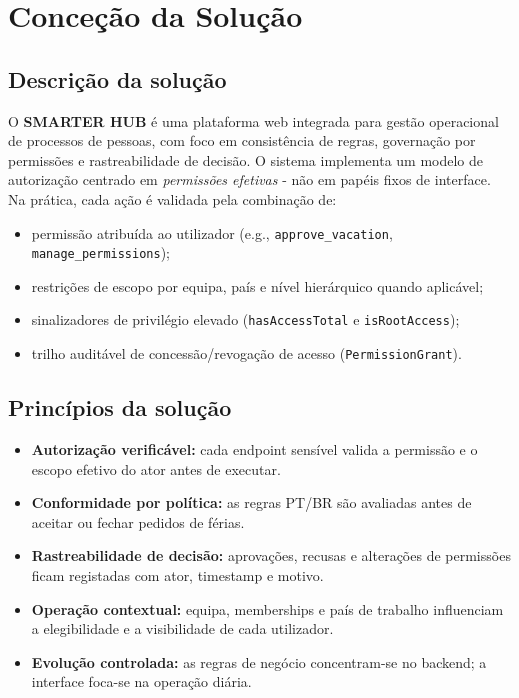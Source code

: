 \documentclass[11pt,a4paper,twoside]{article}
\begin{document}
\section{Conceção da Solução}
\label{sec:solucao}

\subsection{Descrição da solução}

O \textbf{SMARTER HUB} é uma plataforma web integrada para gestão operacional de processos de pessoas, com foco em consistência de regras, governação por permissões e rastreabilidade de decisão. O sistema implementa um modelo de autorização centrado em \emph{permissões efetivas} - não em papéis fixos de interface. Na prática, cada ação é validada pela combinação de:

\begin{itemize}
  \item permissão atribuída ao utilizador (e.g., \texttt{approve\_vacation}, \texttt{manage\_permissions});
  \item restrições de escopo por equipa, país e nível hierárquico quando aplicável;
  \item sinalizadores de privilégio elevado (\texttt{hasAccessTotal} e \texttt{isRootAccess});
  \item trilho auditável de concessão/revogação de acesso (\texttt{PermissionGrant}).
\end{itemize}

\subsection{Princípios da solução}

\begin{itemize}
  \item \textbf{Autorização verificável:} cada endpoint sensível valida a permissão e o escopo efetivo do ator antes de executar.
  \item \textbf{Conformidade por política:} as regras PT/BR são avaliadas antes de aceitar ou fechar pedidos de férias.
  \item \textbf{Rastreabilidade de decisão:} aprovações, recusas e alterações de permissões ficam registadas com ator, timestamp e motivo.
  \item \textbf{Operação contextual:} equipa, memberships e país de trabalho influenciam a elegibilidade e a visibilidade de cada utilizador.
  \item \textbf{Evolução controlada:} as regras de negócio concentram-se no backend; a interface foca-se na operação diária.
\end{itemize}
\end{document}
